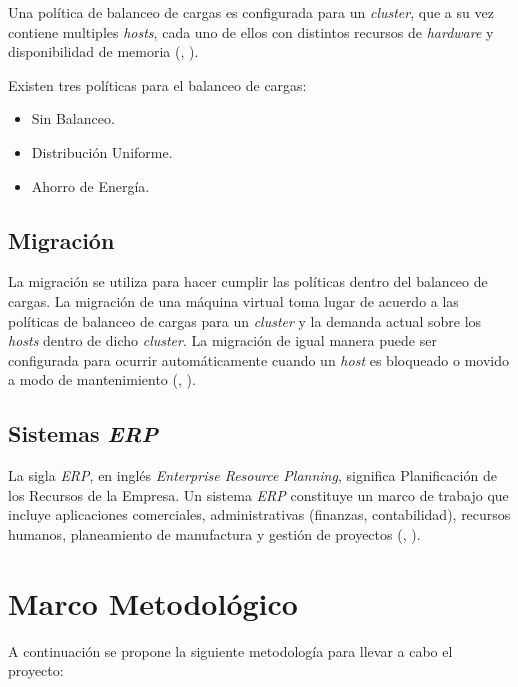 Una pol\'itica de balanceo de cargas es configurada para un \textit{cluster}, que a su vez contiene multiples \textit{hosts}, cada uno de ellos con distintos recursos de \textit{hardware} y disponibilidad de memoria (\citeauthor{redhat}, \citeyear{redhat}). 


Existen tres pol\'iticas para el balanceo de cargas:
\begin{itemize}
	\item Sin Balanceo.
	\item Distribuci\'on Uniforme.
	\item Ahorro de Energ\'ia.
\end{itemize}

\subsection*{Migraci\'on}

La migraci\'on se utiliza para hacer cumplir las pol\'iticas dentro del balanceo de cargas. La migraci\'on de una m\'aquina virtual toma lugar de acuerdo a las pol\'iticas de balanceo de cargas para un \textit{cluster} y la demanda actual sobre los \textit{hosts} dentro de dicho \textit{cluster}. La migraci\'on de igual manera puede ser configurada para ocurrir autom\'aticamente cuando un \textit{host} es bloqueado o movido a modo de mantenimiento (\citeauthor{redhat}, \citeyear{redhat}).
\subsection*{Sistemas \textit{ERP}}

La sigla \textit{ERP}, en ingl\'es \textit{Enterprise Resource Planning}, significa Planificaci\'on de los Recursos de la Empresa. Un sistema \textit{ERP} constituye un marco de trabajo que incluye aplicaciones comerciales, administrativas (finanzas, contabilidad), recursos humanos, planeamiento de manufactura y gesti\'on de proyectos (\citeauthor{saroka2002sistemas}, \citeyear{saroka2002sistemas}). 


\section{Marco Metodol\'ogico}

A continuaci\'on se propone la siguiente metodolog\'ia para llevar a cabo el proyecto:

